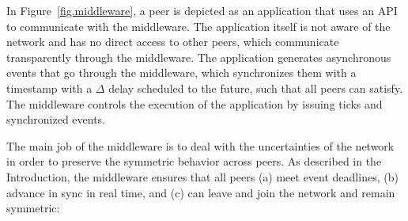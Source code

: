 \documentclass[fleqn,10pt]{SelfArx}
\begin{document}
In Figure~\ref{fig.middleware}, a peer is depicted as an application that uses
an API to communicate with the middleware.
The application itself is not aware of the network and has no direct access to
other peers, which communicate transparently through the middleware.
The application generates asynchronous events that go through the middleware,
which synchronizes them with a timestamp with a $\Delta$ delay scheduled to the
future, such that all peers can satisfy.
The middleware controls the execution of the application by issuing ticks and
synchronized events.

The main job of the middleware is to deal with the uncertainties of the
network in order to preserve the symmetric behavior across peers.
As described in the Introduction, the middleware ensures that all peers
    (a) meet event deadlines,
    (b) advance in sync in real time, and
    (c) can leave and join the network and remain symmetric:
%
\end{document}
